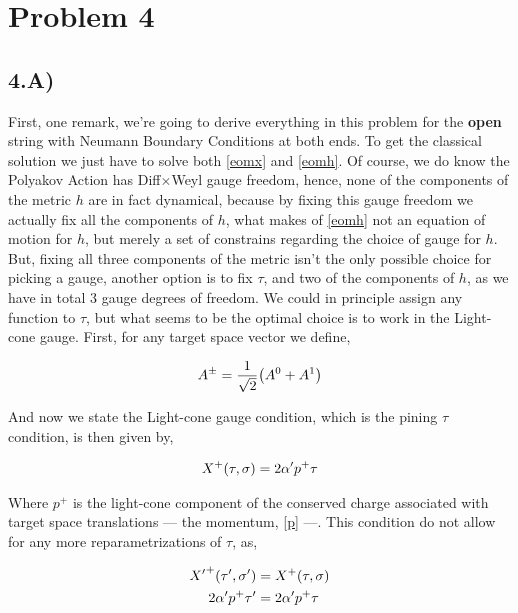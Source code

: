 \section{Problem 4}
\subsection{4.A)}

First, one remark, we're going to derive everything in this problem for the \textbf{open} string with 
Neumann Boundary Conditions at both ends. To get the classical solution we just have to solve both
\ref{eomx} and \ref{eomh}. Of course, we do know the Polyakov Action has  Diff$\times$Weyl gauge freedom, hence, 
none of the components of the metric $h$ are in fact dynamical, because by fixing this gauge freedom we actually 
fix all the components of $h$, what makes of \ref{eomh} not an equation of motion for $h$, but merely a set of 
constrains regarding the choice of gauge for $h$. But, fixing all three components of the metric isn't the 
only possible choice for picking a gauge, another option is to fix $\tau$, and two of the components 
of $h$, as we have in total 3 gauge degrees of freedom. We could in principle assign any function to $\tau$, but 
what seems to be the optimal choice is to work in the Light-cone gauge. First, for any target space vector we define,

\begin{align*}
    A^\pm=\frac{1}{\sqrt2}\qty(A^0+A^1)
\end{align*}

And now we state the Light-cone gauge condition, which is the pining $\tau$ condition, is then given by,

\begin{align*}
    X^+\qty(\tau,\sigma)=2\alpha'p^+\tau
\end{align*}

Where $p^+$ is the light-cone component of the conserved charge associated with target space translations --- the momentum, \ref{p} ---. This 
condition do not allow for any more reparametrizations of $\tau$, as,

\begin{align*}
    {X'}^+\qty(\tau',\sigma')&=X^+\qty(\tau,\sigma)\\
    2\alpha'p^+\tau'&=2\alpha'p^+\tau
\end{align*}

